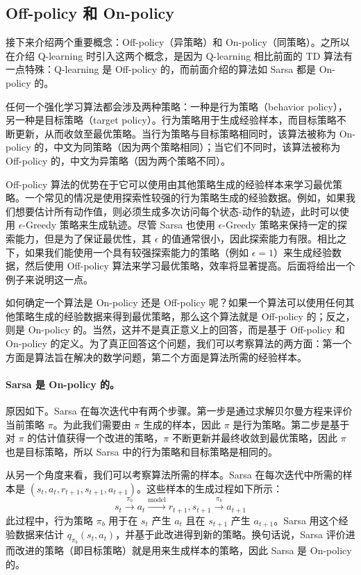\subsection{Off-policy 和 On-policy}
\label{sec:rl-td-off-on-policy}

接下来介绍两个重要概念：Off-policy（异策略）和 On-policy（同策略）。之所以在介绍 Q-learning 时引入这两个概念，是因为 Q-learning 相比前面的 TD 算法有一点特殊：Q-learning 是 Off-policy 的，而前面介绍的算法如 Sarsa 都是 On-policy 的。

任何一个强化学习算法都会涉及两种策略：一种是行为策略（behavior policy），另一种是目标策略（target policy）。行为策略用于生成经验样本，而目标策略不断更新，从而收敛至最优策略。当行为策略与目标策略相同时，该算法被称为 On-policy 的，中文为同策略（因为两个策略相同）；当它们不同时，该算法被称为 Off-policy 的，中文为异策略（因为两个策略不同）。

Off-policy 算法的优势在于它可以使用由其他策略生成的经验样本来学习最优策略。一个常见的情况是使用探索性较强的行为策略生成的经验数据。例如，如果我们想要估计所有动作值，则必须生成多次访问每个状态-动作的轨迹，此时可以使用 $\epsilon$-Greedy 策略来生成轨迹。尽管 Sarsa 也使用 $\epsilon$-Greedy 策略来保持一定的探索能力，但是为了保证最优性，其 $\epsilon$ 的值通常很小，因此探索能力有限。相比之下，如果我们能使用一个具有较强探索能力的策略（例如 $\epsilon = 1$）来生成经验数据，然后使用 Off-policy 算法来学习最优策略，效率将显著提高。后面将给出一个例子来说明这一点。

如何确定一个算法是 On-policy 还是 Off-policy 呢？如果一个算法可以使用任何其他策略生成的经验数据来得到最优策略，那么这个算法就是 Off-policy 的；反之，则是 On-policy 的。当然，这并不是真正意义上的回答，而是基于 Off-policy 和 On-policy 的定义。为了真正回答这个问题，我们可以考察算法的两方面：第一个方面是算法旨在解决的数学问题，第二个方面是算法所需的经验样本。

\paragraph{Sarsa 是 On-policy 的。}
原因如下。Sarsa 在每次迭代中有两个步骤。第一步是通过求解贝尔曼方程来评价当前策略 $\pi$。为此我们需要由 $\pi$ 生成的样本，因此 $\pi$ 是行为策略。第二步是基于对 $\pi$ 的估计值获得一个改进的策略，$\pi$ 不断更新并最终收敛到最优策略，因此 $\pi$ 也是目标策略，所以 Sarsa 中的行为策略和目标策略是相同的。

从另一个角度来看，我们可以考察算法所需的样本。Sarsa 在每次迭代中所需的样本是 $(s_t, a_t, r_{t+1}, s_{t+1}, a_{t+1})$。这些样本的生成过程如下所示：
\[
  s_t \xrightarrow{\pi_b} a_t \xrightarrow{\mathrm{model}} r_{t+1}, s_{t+1} \xrightarrow{\pi_b} a_{t+1}
\]
此过程中，行为策略 $\pi_b$ 用于在 $s_t$ 产生 $a_t$ 且在 $s_{t+1}$ 产生 $a_{t+1}$。Sarsa 用这个经验数据来估计 $q_{\pi_b}(s_t, a_t)$，并基于此改进得到新的策略。换句话说，Sarsa 评价进而改进的策略（即目标策略）就是用来生成样本的策略，因此 Sarsa 是 On-policy 的。

